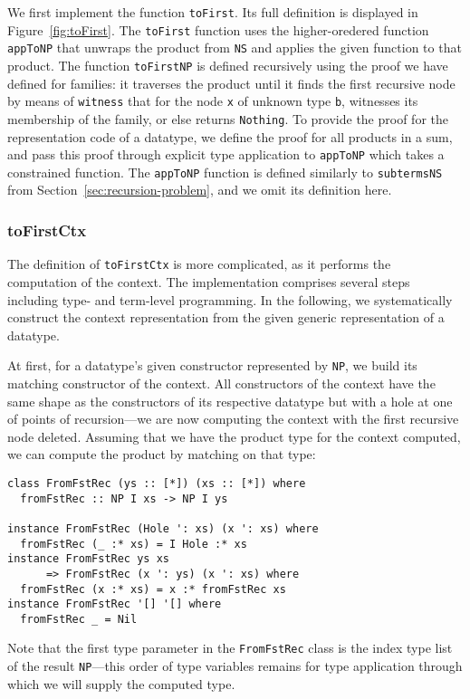 \documentclass[runningheads]{llncs}
\newcommand{\K}[1]{\lstinline{#1}}
\begin{document}
We first implement the function \K{toFirst}. Its full definition is displayed in Figure~\ref{fig:toFirst}. The \K{toFirst} function uses the higher-oredered function \K{appToNP} that unwraps the product from \K{NS} and applies the given function to that product. The function \K{toFirstNP} is defined recursively using the proof we have defined for families: it traverses the product until it finds the first recursive node by means of \K{witness} that for the node \K{x} of unknown type \K{b}, witnesses its membership of the family, or else returns \K{Nothing}. To provide the proof for the representation code of a datatype, we define the proof for all products in a sum, and pass this proof through explicit type application to \K{appToNP} which takes a constrained function. The \K{appToNP} function is defined similarly to \K{subtermsNS} from Section~\ref{sec:recursion-problem}, and we omit its definition here.

\subsubsection{toFirstCtx}

The definition of \K{toFirstCtx} is more complicated, as it performs the computation of the context. The implementation comprises several steps including type- and term-level programming. In the following, we systematically construct the context representation from the given generic representation of a datatype.

At first, for a datatype's given constructor represented by \K{NP}, we build its matching constructor of the context. All constructors of the context have the same shape as the constructors of its respective datatype but with a hole at one of points of recursion---we are now computing the context with the first recursive node deleted. Assuming that we have the product type for the context computed, we can compute the product by matching on that type:
\begin{lstlisting}
class FromFstRec (ys :: [*]) (xs :: [*]) where
  fromFstRec :: NP I xs -> NP I ys

instance FromFstRec (Hole ': xs) (x ': xs) where
  fromFstRec (_ :* xs) = I Hole :* xs
instance FromFstRec ys xs
      => FromFstRec (x ': ys) (x ': xs) where
  fromFstRec (x :* xs) = x :* fromFstRec xs
instance FromFstRec '[] '[] where
  fromFstRec _ = Nil
\end{lstlisting}
Note that the first type parameter in the \K{FromFstRec} class is the index type list of the result \K{NP}---this order of type variables remains for type application through which we will supply the computed type.
\end{document}
